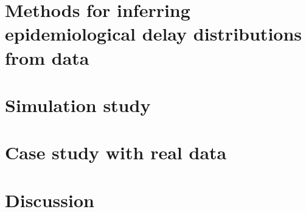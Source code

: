 \documentclass[12pt]{article}
\begin{document}
\section{Methods for inferring epidemiological delay distributions from data}

\section{Simulation study}

\section{Case study with real data}

\section{Discussion}

\pagebreak


\end{document}
